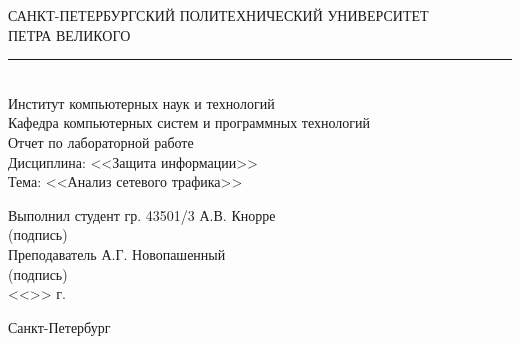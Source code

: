 \begin{titlepage}
\begin{center}
	САНКТ-ПЕТЕРБУРГСКИЙ ПОЛИТЕХНИЧЕСКИЙ УНИВЕРСИТЕТ\\ ПЕТРА ВЕЛИКОГО\\[0.3cm]
	\par\noindent\rule{10cm}{0.4pt}\\[0.3cm]
	Институт компьютерных наук и технологий \\[0.3cm]
	Кафедра компьютерных систем и программных технологий\\[4cm]
	
	Отчет по лабораторной работе\\[3mm]
	Дисциплина: <<Защита информации>>\\[3mm]
	Тема: <<Анализ сетевого трафика>>\\[7cm]
\end{center}

\begin{flushleft}
	\hspace*{5mm} Выполнил студент гр. 43501/3  \hspace*{1.5cm}\sign[3cm]\hfill А.В. Кнорре\\
	\hspace*{9.4cm} (подпись)\\[3mm]
	\hspace*{5mm} Преподаватель \hspace*{5.0cm}\sign[3cm]\hfill А.Г. Новопашенный\\
	\hspace*{9.4cm} (подпись)\\[5mm]
	\hspace*{11.1cm} <<\sign[7mm]>> \sign[27mm] \the\year\hspace{1mm} г.
\end{flushleft}

\vfill

\begin{center}
	Санкт-Петербург\\
	\the\year
\end{center}
\end{titlepage}
\addtocounter{page}{1}